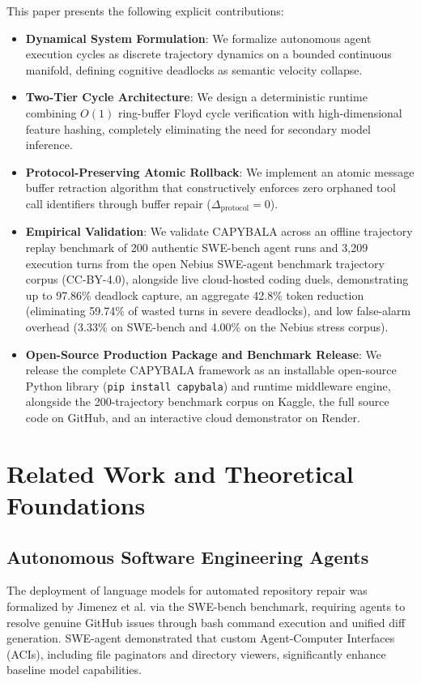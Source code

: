 \documentclass[journal]{IEEEtran}
\begin{document}
This paper presents the following explicit contributions:
\begin{itemize}[leftmargin=12pt, topsep=2pt, itemsep=1pt]
    \item \textbf{Dynamical System Formulation}: We formalize autonomous agent execution cycles as discrete trajectory dynamics on a bounded continuous manifold, defining cognitive deadlocks as semantic velocity collapse.
    \item \textbf{Two-Tier Cycle Architecture}: We design a deterministic runtime combining $O(1)$ ring-buffer Floyd cycle verification with high-dimensional feature hashing, completely eliminating the need for secondary model inference.
    \item \textbf{Protocol-Preserving Atomic Rollback}: We implement an atomic message buffer retraction algorithm that constructively enforces zero orphaned tool call identifiers through buffer repair ($\Delta_{\text{protocol}} = 0$).
    \item \textbf{Empirical Validation}: We validate CAPYBALA across an offline trajectory replay benchmark of 200 authentic SWE-bench agent runs and 3,209 execution turns from the open Nebius SWE-agent benchmark trajectory corpus (CC-BY-4.0), alongside live cloud-hosted coding duels, demonstrating up to 97.86\% deadlock capture, an aggregate 42.8\% token reduction (eliminating 59.74\% of wasted turns in severe deadlocks), and low false-alarm overhead (3.33\% on SWE-bench and 4.00\% on the Nebius stress corpus).
    \item \textbf{Open-Source Production Package and Benchmark Release}: We release the complete CAPYBALA framework as an installable open-source Python library (\texttt{pip install capybala}) and runtime middleware engine, alongside the 200-trajectory benchmark corpus on Kaggle, the full source code on GitHub, and an interactive cloud demonstrator on Render.
\end{itemize}

\section{Related Work and Theoretical Foundations}

\subsection{Autonomous Software Engineering Agents}
The deployment of language models for automated repository repair was formalized by Jimenez et al. \cite{jimenez2024swebench} via the SWE-bench benchmark, requiring agents to resolve genuine GitHub issues through bash command execution and unified diff generation. SWE-agent \cite{yang2024sweagent} demonstrated that custom Agent-Computer Interfaces (ACIs), including file paginators and directory viewers, significantly enhance baseline model capabilities. 
\end{document}

